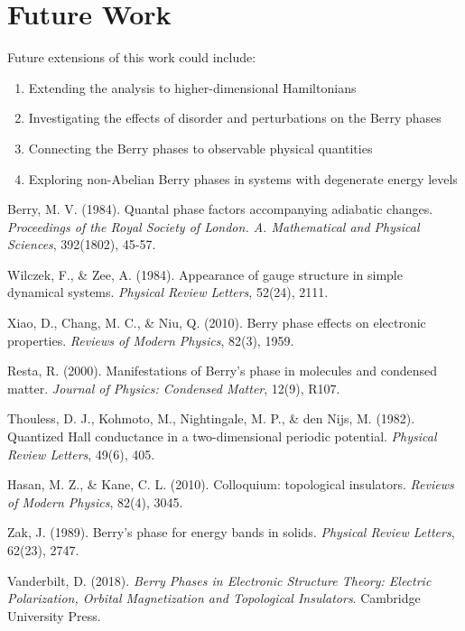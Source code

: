 \documentclass[12pt,a4paper]{article}
\begin{document}
\section{Future Work}

Future extensions of this work could include:

\begin{enumerate}
    \item Extending the analysis to higher-dimensional Hamiltonians
    \item Investigating the effects of disorder and perturbations on the Berry phases
    \item Connecting the Berry phases to observable physical quantities
    \item Exploring non-Abelian Berry phases in systems with degenerate energy levels
\end{enumerate}

\begin{thebibliography}{9}

 Berry, M. V. (1984). Quantal phase factors accompanying adiabatic changes. \textit{Proceedings of the Royal Society of London. A. Mathematical and Physical Sciences}, 392(1802), 45-57.

 Wilczek, F., \& Zee, A. (1984). Appearance of gauge structure in simple dynamical systems. \textit{Physical Review Letters}, 52(24), 2111.

 Xiao, D., Chang, M. C., \& Niu, Q. (2010). Berry phase effects on electronic properties. \textit{Reviews of Modern Physics}, 82(3), 1959.

 Resta, R. (2000). Manifestations of Berry's phase in molecules and condensed matter. \textit{Journal of Physics: Condensed Matter}, 12(9), R107.

 Thouless, D. J., Kohmoto, M., Nightingale, M. P., \& den Nijs, M. (1982). Quantized Hall conductance in a two-dimensional periodic potential. \textit{Physical Review Letters}, 49(6), 405.

 Hasan, M. Z., \& Kane, C. L. (2010). Colloquium: topological insulators. \textit{Reviews of Modern Physics}, 82(4), 3045.

 Zak, J. (1989). Berry's phase for energy bands in solids. \textit{Physical Review Letters}, 62(23), 2747.

 Vanderbilt, D. (2018). \textit{Berry Phases in Electronic Structure Theory: Electric Polarization, Orbital Magnetization and Topological Insulators}. Cambridge University Press.

\end{thebibliography}
\end{document}
